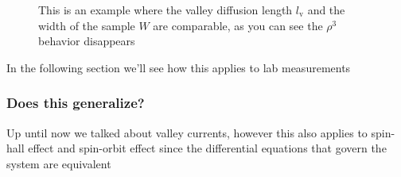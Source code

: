 \begin{figure}
    \caption{This is an example where the valley diffusion length $l_\textrm{v}$ and the width of the sample $W$ are comparable, as you can see the $\rho^3$ behavior disappears}
    \label{fig:mixedrho}
\end{figure}

In the following section we'll see how this applies to lab measurements



\subsubsection*{Does this generalize?}
Up until now we talked about valley currents, however this also applies to spin-hall effect and spin-orbit effect since the differential equations that govern the system are equivalent

